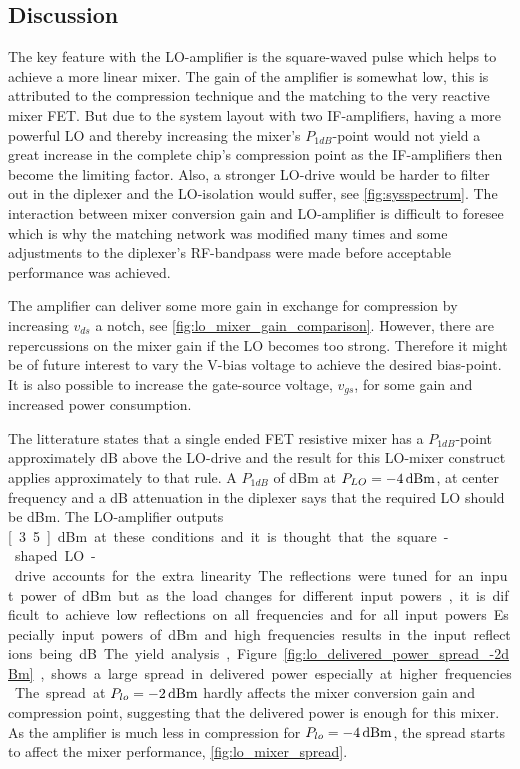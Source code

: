 	\subsection{Discussion}
		The key feature with the LO-amplifier is the square-waved pulse which helps to achieve a more linear mixer. The gain of the amplifier is somewhat low, this is attributed to the compression technique and the matching to the very reactive mixer FET. But due to the system layout with two IF-amplifiers, having a more powerful LO and thereby increasing the mixer's $P_{1dB}$-point would not yield a great increase in the complete chip's compression point as the IF-amplifiers then become the limiting factor. Also, a stronger LO-drive would be harder to filter out in the diplexer and the LO-isolation would suffer, see \autoref{fig:sysspectrum}. The interaction between mixer conversion gain and LO-amplifier is difficult to foresee which is why the matching network was modified many times and some adjustments to the diplexer's RF-bandpass were made before acceptable performance was achieved.
		
		The amplifier can deliver some more gain in exchange for compression by increasing $v_{ds}$ a notch, see \autoref{fig:lo_mixer_gain_comparison}. However, there are repercussions on the mixer gain if the LO becomes too strong. Therefore it might be of future interest to vary the \unit[5]{V}-bias voltage to achieve the desired bias-point. It is also possible to increase the gate-source voltage, $v_{gs}$, for some gain and increased power consumption. 
		
		The litterature states that a single ended FET resistive mixer has a $P_{1dB}$-point approximately \unit[4]{dB} above the LO-drive\autocite{radmanesh2002state} and the result for this LO-mixer construct applies approximately to that rule. A $P_{1dB}$ of \unit[12]{dBm} at $P_{LO}=\unit[-4]{dBm}$, at center frequency and a \unit[3]{dB} attenuation in the diplexer says that the required LO should be \unit[5]{dBm}. The LO-amplifier outputs \unit[3.5]{dBm} at these conditions and it is thought that the square-shaped LO-drive accounts for the extra linearity.
		
		The reflections were tuned for an input power of \unit[-2]{dBm} but as the load changes for different input powers, it is difficult to achieve low reflections on all frequencies and for all input powers. Especially input powers of \unit[-4]{dBm} and high frequencies results in the input reflections being \unit[-10]{dB}.
		
		The yield analysis, Figure \autoref{fig:lo_delivered_power_spread_-2dBm}, shows a large spread in delivered power especially at higher frequencies.  The spread at $P_{lo}=\unit[-2]{dBm}$ hardly affects the mixer conversion gain and compression point, suggesting that the delivered power is enough for this mixer. As the amplifier is much less in compression for $P_{lo}=\unit[-4]{dBm}$, the spread starts to affect the mixer performance, \autoref{fig:lo_mixer_spread}.
		
